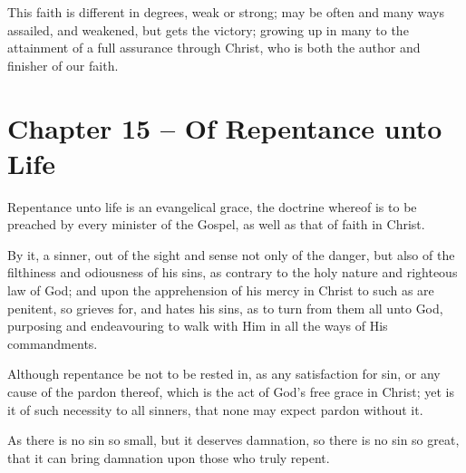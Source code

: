 \begin{outerlst}[left=0pt,labelsep=0pt]
\begin{innerlst}[resume*]
\item This faith is different in degrees, weak or strong; may be often and many ways assailed, and weakened, but gets the victory; growing up in many to the attainment of a full assurance through Christ, who is both the author and finisher of our faith.  
\end{innerlst}

\item
{}
\section{Chapter 15 -- Of Repentance unto Life}
\begin{innerlst}[resume*]

\item Repentance unto life is an evangelical grace, the doctrine whereof is to be preached by every minister of the Gospel, as well as that of faith in Christ.   

\item By it, a sinner, out of the sight and sense not only of the danger, but also of the filthiness and odiousness of his sins, as contrary to the holy nature and righteous law of God; and upon the apprehension of his mercy in Christ to such as are penitent, so grieves for, and hates his sins, as to turn from them all unto God, purposing and endeavouring to walk with Him in all the ways of His commandments.   

\item Although repentance be not to be rested in, as any satisfaction for sin, or any cause of the pardon thereof, which is the act of God's free grace in Christ; yet is it of such necessity to all sinners, that none may expect pardon without it.   

\item As there is no sin so small, but it deserves damnation, so there is no sin so great, that it can bring damnation upon those who truly repent.   


\end{innerlst}
\end{outerlst}
